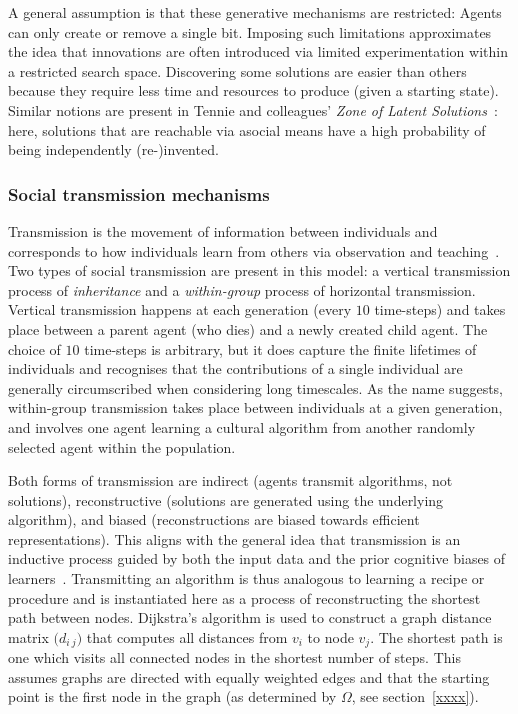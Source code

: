 \documentclass{article}
\begin{document}
A general assumption is that these generative mechanisms are restricted: Agents can only create or remove a single bit. Imposing such limitations approximates the idea that innovations are often introduced via limited experimentation within a restricted search space. Discovering some solutions are easier than others because they require less time and resources to produce (given a starting state). Similar notions are present in Tennie and colleagues' {\em Zone of Latent Solutions}~\cite{tennie_claudio_ratcheting_2009}: here, solutions that are reachable via asocial means have a high probability of being independently (re-)invented.

\subsubsection{Social transmission mechanisms}
Transmission is the movement of information between individuals and corresponds to how individuals learn from others via observation and teaching~\cite{gergely2006sylvia}. Two types of social transmission are present in this model: a vertical transmission process of {\em inheritance} and a {\em within-group} process of horizontal transmission. Vertical transmission happens at each generation (every $10$ time-steps) and takes place between a parent agent (who dies) and a newly created child agent. The choice of $10$ time-steps is arbitrary, but it does capture the finite lifetimes of individuals and recognises that the contributions of a single individual are generally circumscribed when considering long timescales. As the name suggests, within-group transmission takes place between individuals at a given generation, and involves one agent learning a cultural algorithm from another randomly selected agent within the population.

Both forms of transmission are indirect (agents transmit algorithms, not solutions), reconstructive (solutions are generated using the underlying algorithm), and biased (reconstructions are biased towards efficient representations). This aligns with the general idea that transmission is an inductive process guided by both the input data and the prior cognitive biases of learners~\cite{chater2003simplicity,griffiths2007language,kirby2007innateness,culbertson2016simplicity}. Transmitting an algorithm is thus analogous to learning a recipe or procedure and is instantiated here as a process of reconstructing the shortest path between nodes. Dijkstra's algorithm is used to construct a graph distance matrix $\bigl(d_{i \  j}\bigr)$ that computes all distances from $v_i$ to node $v_j$. The shortest path is one which visits all connected nodes in the shortest number of steps. This assumes graphs are directed with equally weighted edges and that the starting point is the first node in the graph (as determined by $\Omega$, see section~\ref{xxxx}).
\end{document}
